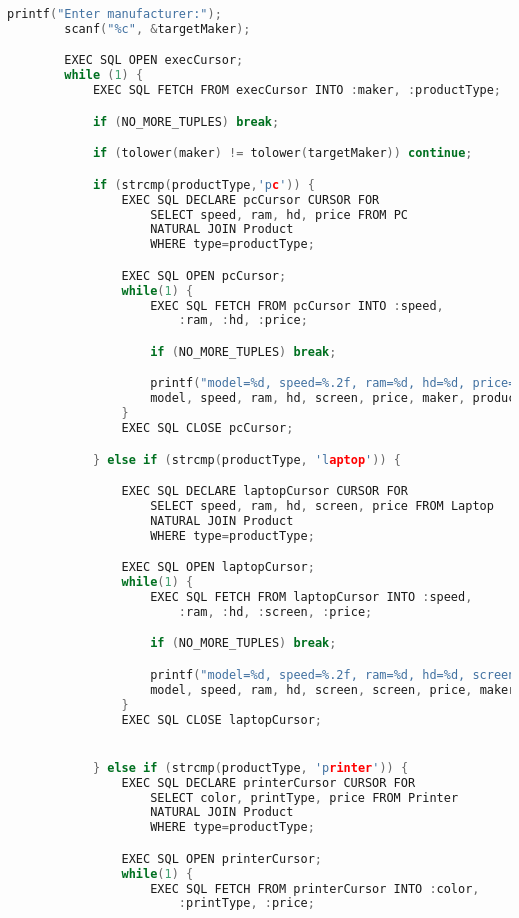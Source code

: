 \documentclass[12pt]{article}
\begin{document}
\begin{enumerate}[1.]
\begin{enumerate}[a)]
\begin{lstlisting}[language=c]
        printf("Enter manufacturer:");
        scanf("%c", &targetMaker);

        EXEC SQL OPEN execCursor;
        while (1) {
            EXEC SQL FETCH FROM execCursor INTO :maker, :productType;

            if (NO_MORE_TUPLES) break;

            if (tolower(maker) != tolower(targetMaker)) continue;

            if (strcmp(productType,'pc')) {
                EXEC SQL DECLARE pcCursor CURSOR FOR
                    SELECT speed, ram, hd, price FROM PC
                    NATURAL JOIN Product
                    WHERE type=productType;

                EXEC SQL OPEN pcCursor;
                while(1) {
                    EXEC SQL FETCH FROM pcCursor INTO :speed,
                        :ram, :hd, :price;

                    if (NO_MORE_TUPLES) break;

                    printf("model=%d, speed=%.2f, ram=%d, hd=%d, price=%.2f, maker=%c, type=%s",
                    model, speed, ram, hd, screen, price, maker, productType);
                }
                EXEC SQL CLOSE pcCursor;

            } else if (strcmp(productType, 'laptop')) {

                EXEC SQL DECLARE laptopCursor CURSOR FOR
                    SELECT speed, ram, hd, screen, price FROM Laptop
                    NATURAL JOIN Product
                    WHERE type=productType;

                EXEC SQL OPEN laptopCursor;
                while(1) {
                    EXEC SQL FETCH FROM laptopCursor INTO :speed,
                        :ram, :hd, :screen, :price;

                    if (NO_MORE_TUPLES) break;

                    printf("model=%d, speed=%.2f, ram=%d, hd=%d, screen=%d, price=%.2f, maker=%c, type=%s",
                    model, speed, ram, hd, screen, screen, price, maker, productType);
                }
                EXEC SQL CLOSE laptopCursor;


            } else if (strcmp(productType, 'printer')) {
                EXEC SQL DECLARE printerCursor CURSOR FOR
                    SELECT color, printType, price FROM Printer
                    NATURAL JOIN Product
                    WHERE type=productType;

                EXEC SQL OPEN printerCursor;
                while(1) {
                    EXEC SQL FETCH FROM printerCursor INTO :color,
                        :printType, :price;


\end{lstlisting}
\end{enumerate}
\end{enumerate}
\end{document}
